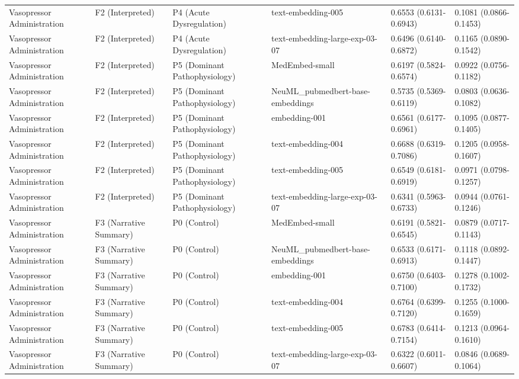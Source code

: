 \begin{tabular}{llllll}
Vasopressor Administration & F2 (Interpreted) & P4 (Acute Dysregulation) & text-embedding-005 & 0.6553 (0.6131-0.6943) & 0.1081 (0.0866-0.1453) \\
Vasopressor Administration & F2 (Interpreted) & P4 (Acute Dysregulation) & text-embedding-large-exp-03-07 & 0.6496 (0.6140-0.6872) & 0.1165 (0.0890-0.1542) \\
Vasopressor Administration & F2 (Interpreted) & P5 (Dominant Pathophysiology) & MedEmbed-small & 0.6197 (0.5824-0.6574) & 0.0922 (0.0756-0.1182) \\
Vasopressor Administration & F2 (Interpreted) & P5 (Dominant Pathophysiology) & NeuML\_pubmedbert-base-embeddings & 0.5735 (0.5369-0.6119) & 0.0803 (0.0636-0.1082) \\
Vasopressor Administration & F2 (Interpreted) & P5 (Dominant Pathophysiology) & embedding-001 & 0.6561 (0.6177-0.6961) & 0.1095 (0.0877-0.1405) \\
Vasopressor Administration & F2 (Interpreted) & P5 (Dominant Pathophysiology) & text-embedding-004 & 0.6688 (0.6319-0.7086) & 0.1205 (0.0958-0.1607) \\
Vasopressor Administration & F2 (Interpreted) & P5 (Dominant Pathophysiology) & text-embedding-005 & 0.6549 (0.6181-0.6919) & 0.0971 (0.0798-0.1257) \\
Vasopressor Administration & F2 (Interpreted) & P5 (Dominant Pathophysiology) & text-embedding-large-exp-03-07 & 0.6341 (0.5963-0.6733) & 0.0944 (0.0761-0.1246) \\
Vasopressor Administration & F3 (Narrative Summary) & P0 (Control) & MedEmbed-small & 0.6191 (0.5821-0.6545) & 0.0879 (0.0717-0.1143) \\
Vasopressor Administration & F3 (Narrative Summary) & P0 (Control) & NeuML\_pubmedbert-base-embeddings & 0.6533 (0.6171-0.6913) & 0.1118 (0.0892-0.1447) \\
Vasopressor Administration & F3 (Narrative Summary) & P0 (Control) & embedding-001 & 0.6750 (0.6403-0.7100) & 0.1278 (0.1002-0.1732) \\
Vasopressor Administration & F3 (Narrative Summary) & P0 (Control) & text-embedding-004 & 0.6764 (0.6399-0.7120) & 0.1255 (0.1000-0.1659) \\
Vasopressor Administration & F3 (Narrative Summary) & P0 (Control) & text-embedding-005 & 0.6783 (0.6414-0.7154) & 0.1213 (0.0964-0.1610) \\
Vasopressor Administration & F3 (Narrative Summary) & P0 (Control) & text-embedding-large-exp-03-07 & 0.6322 (0.6011-0.6607) & 0.0846 (0.0689-0.1064) \\

\end{tabular}
